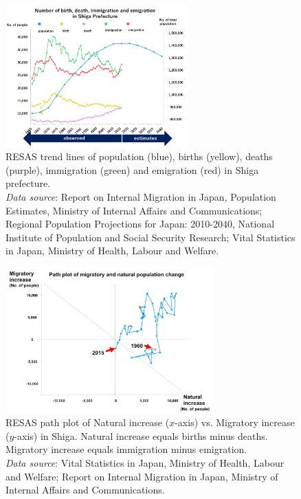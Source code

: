 \documentclass[10pt, conference, compsocconf]{IEEEtran}
\begin{document}
\begin{figure}[!t]
\begin{center}
    \includegraphics[width= 7cm]{fig/fig1_1.png}
\caption{RESAS trend lines of population (blue), births (yellow), deaths (purple), immigration (green) and emigration (red) in Shiga prefecture. 
\\{\it Data source}: Report on Internal Migration in Japan, Population Estimates, Ministry of Internal Affairs and Communications; Regional Population Projections for Japan: 2010-2040, National Institute of Population and Social Security Research; Vital Statistics in Japan, Ministry of Health, Labour and Welfare.
}\label{fig1}
\end{center}
\end{figure}
\begin{figure}[!t]
\begin{center}
    \includegraphics[width= 8cm]{fig/fig2_2.png}
\caption{RESAS path plot of Natural increase ($x$-axis) vs. Migratory increase ($y$-axis) in Shiga. Natural increase equals births minus deaths. Migratory increase equals immigration minus emigration.
\\{\it Data source}: Vital Statistics in Japan, Ministry of Health, Labour and Welfare; Report on Internal Migration in Japan, Ministry of Internal Affairs and Communications.
}\label{fig2}
\end{center}
\end{figure}
\end{document}
